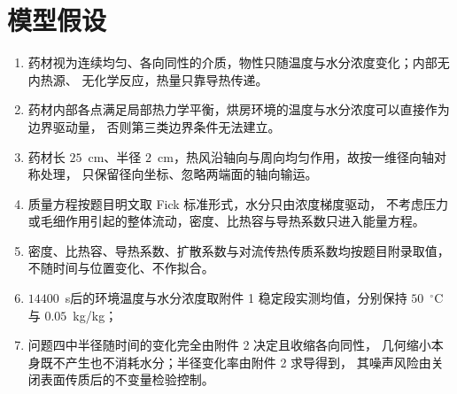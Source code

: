 \section{模型假设}

\begin{enumerate}[label=\arabic*., leftmargin=2.6em, itemsep=4pt]
  \item 药材视为连续均匀、各向同性的介质，物性只随温度与水分浓度变化；内部无内热源、
        无化学反应，热量只靠导热传递。
  \item 药材内部各点满足局部热力学平衡，烘房环境的温度与水分浓度可以直接作为边界驱动量，
        否则第三类边界条件无法建立。
  \item 药材长 $25$~cm、半径 $2$~cm，热风沿轴向与周向均匀作用，故按一维径向轴对称处理，
        只保留径向坐标、忽略两端面的轴向输运。
  \item 质量方程按题目明文取 Fick 标准形式，水分只由浓度梯度驱动，
        不考虑压力或毛细作用引起的整体流动，密度、比热容与导热系数只进入能量方程。
  \item 密度、比热容、导热系数、扩散系数与对流传热传质系数均按题目附录取值，
        不随时间与位置变化、不作拟合。
  \item $14400$~s后的环境温度与水分浓度取附件 1 稳定段实测均值，分别保持 $50$~$^\circ$C 与 $0.05$~kg/kg；
  \item 问题四中半径随时间的变化完全由附件 2 决定且收缩各向同性，
        几何缩小本身既不产生也不消耗水分；半径变化率由附件 2 求导得到，
        其噪声风险由关闭表面传质后的不变量检验控制。
\end{enumerate}
